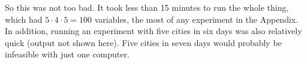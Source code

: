 \documentclass{article}
\begin{document}
So this was not too bad. It took less than 15 minutes to run the whole thing, which had $5\cdot 4\cdot 5 = 100$ variables, the most of any experiment
in the Appendix. In addition, running an experiment with five cities in six days was also relatively quick (output not shown here). Five cities in
seven days would probably be infeasible with just one computer.
\end{document}
